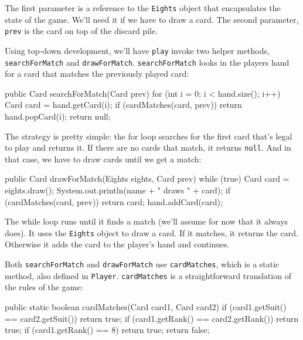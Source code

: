 \documentclass[12pt]{book}
\theoremstyle{exercise}
\newcommand{\java}[1]{\verb"#1"}
\begin{document}
The first parameter is a reference to the \java{Eights} object that encapsulates the state of the game.
We'll need it if we have to draw a card.
The second parameter, \java{prev} is the card on top of the discard pile.


Using top-down development, we'll have \java{play} invoke two helper methods, \java{searchForMatch} and \java{drawForMatch}.
\java{searchForMatch} looks in the players hand for a card that matches the previously played card:

\begin{code}
    public Card searchForMatch(Card prev) {
        for (int i = 0; i < hand.size(); i++) {
            Card card = hand.getCard(i);
            if (cardMatches(card, prev)) {
                return hand.popCard(i);
            }
        }
        return null;
    }
\end{code}

The strategy is pretty simple: the for loop searches for the first card that's legal to play and returns it.
If there are no cards that match, it returns \java{null}.
And in that case, we have to draw cards until we get a match:

\begin{code}
    public Card drawForMatch(Eights eights, Card prev) {
        while (true) {
            Card card = eights.draw();
            System.out.println(name + " draws " + card);
            if (cardMatches(card, prev)) {
                return card;
            }
            hand.addCard(card);
        }
    }
\end{code}

The while loop runs until it finds a match (we'll assume for now that it always does).
It uses the \java{Eights} object to draw a card.
If it matches, it returns the card.
Otherwise it adds the card to the player's hand and continues.

Both \java{searchForMatch} and \java{drawForMatch} use \java{cardMatches}, which is a static method, also defined in \java{Player}.
\java{cardMatches} is a straightforward translation of the rules of the game:

\begin{code}
    public static boolean cardMatches(Card card1, Card card2) {
        if (card1.getSuit() == card2.getSuit()) {
            return true;
        }
        if (card1.getRank() == card2.getRank()) {
            return true;
        }
        if (card1.getRank() == 8) {
            return true;
        }
        return false;
    }
\end{code}
\end{document}
